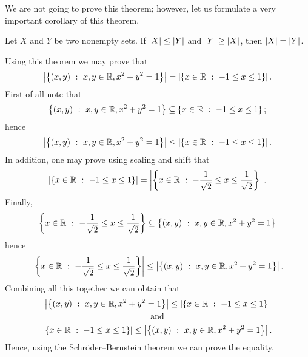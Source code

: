 We are not going to prove this theorem; however, let us formulate a very
important corollary of this theorem.
\begin{corollary}
\label{corollary:schroder-bernstein}
  Let $X$ and $Y$ be two nonempty sets. If $\left|{X}\right| \le \left|{Y}\right|$
  and $\left|{Y}\right| \ge \left|{X}\right|$, then $\left|{X}\right| =
  \left|{Y}\right|$.
\end{corollary}

Using this theorem we may prove that 
\[
  \cardinality{\set[x, y \in \R, x^2 + y^2 = 1]{(x, y)}} = 
  \cardinality{\set[-1 \le x \le 1]{x \in \R}}.
\]
First of all note that 
\[
  \set[x, y \in \R, x^2 + y^2 = 1]{(x, y)}
  \subseteq \set[-1 \le x \le 1]{x \in \R};
\]
hence
\[
  \cardinality{\set[x, y \in \R, x^2 + y^2 = 1]{(x, y)}} \le 
  \cardinality{\set[-1 \le x \le 1]{x \in \R}}.
\]
In addition, one may prove using scaling and shift that
\[
  \cardinality{\set[-1 \le x \le 1]{x \in \R}} = 
  \cardinality{\set[-\frac{1}{\sqrt{2}} \le x \le \frac{1}{\sqrt{2}}]{x \in \R}}.
\]
Finally, 
\[
  \set[-\frac{1}{\sqrt{2}} \le x \le \frac{1}{\sqrt{2}}]{x \in \R}
  \subseteq 
  \set[x, y \in \R, x^2 + y^2 = 1]{(x, y)}
\]
hence
\[
  \cardinality{
    \set[-\frac{1}{\sqrt{2}} \le x \le \frac{1}{\sqrt{2}}]{x \in \R}
  }
  \le
  \cardinality{
    \set[x, y \in \R, x^2 + y^2 = 1]{(x, y)}
  }.
\]
Combining all this together we can obtain that
\begin{gather*}
  \cardinality{
    \set[x, y \in \R, x^2 + y^2 = 1]{(x, y)}
  } \le 
  \cardinality{\set[-1 \le x \le 1]{x \in \R}} \\
  \text{and}\\
  \cardinality{\set[-1 \le x \le 1]{x \in \R}} \le
  \cardinality{
    \set[x, y \in \R, x^2 + y^2 = 1]{(x, y)}
  }.
\end{gather*}
Hence, using the Schr\"{o}der–Bernstein theorem we can prove the equality.

